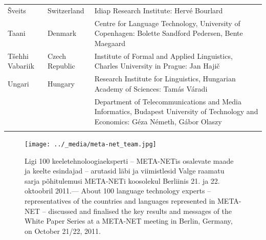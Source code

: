 \begin{longtable}{@{}llp{113mm}@{}}
  Šveits & \textcolor{grey1}{Switzerland} & Idiap Research Institute: Hervé Bourlard \\ \addlinespace 
Taani &  \textcolor{grey1}{Denmark} & Centre for Language Technology, University of Copenhagen: \newline Bolette Sandford Pedersen, Bente Maegaard\\ \addlinespace
  Tšehhi Vabariik & \textcolor{grey1}{Czech Republic} & Institute of Formal and Applied Linguistics, Charles University in Prague: Jan Hajič \\ \addlinespace
  Ungari & \textcolor{grey1}{Hungary} & Research Institute for Linguistics, Hungarian Academy of Sciences: Tamás Váradi\\  \addlinespace
  & & Department of Telecommunications and Media Informatics, Budapest University of Technology and Economics: Géza Németh, Gábor Olaszy\\ \addlinespace
\end{longtable}

\normalsize

\renewcommand*{\figureformat}{}
\renewcommand*{\captionformat}{}

\begin{figure}[htbp]
  \center
  \texttt{[image: ../\_media/meta-net\_team.jpg]}
  \caption{Ligi 100 keeletehnoloogiaeksperti -- META-NETis osalevate maade ja keelte esindajad -- arutasid läbi ja viimistlesid Valge raamatu sarja põhitulemusi META-NETi koosolekul Berliinis 21. ja 22. oktoobril 2011.--- \textcolor{grey1}{About 100 language technology experts -- representatives of the countries and languages represented in META-NET -- discussed and finalised the key results and messages of the White Paper Series at a META-NET meeting in Berlin, Germany, on October 21/22, 2011.}}
  \medskip
\end{figure}

\cleardoublepage

\label{whitepaperseries}

